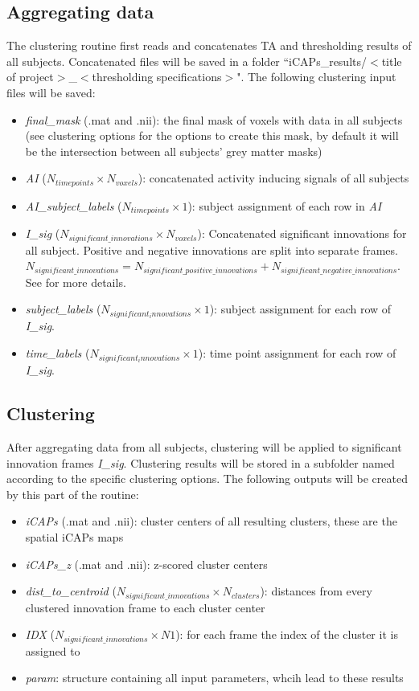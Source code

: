 \documentclass{article}
\begin{document}
\subsection{Aggregating data}
The clustering routine first reads and concatenates TA and thresholding results of all subjects. Concatenated files will be saved in a folder ``iCAPs\_results/$<$title of project$>$\_$<$thresholding specifications$>$". The following clustering input files will be saved:
\begin{itemize}
\item \textit{final\_mask} (.mat and .nii): the final mask of voxels with data in all subjects (see clustering options for the options to create this mask, by default it will be the intersection between all subjects' grey matter masks)
\item \textit{AI} ($N_{timepoints} \times N_{voxels}$): concatenated activity inducing signals of all subjects
\item \textit{AI\_subject\_labels} ($N_{timepoints} \times 1$): subject assignment of each row in \textit{AI}
\item \textit{I\_sig} ($N_{significant\_innovations} \times N_{voxels}$): Concatenated significant innovations for all subject. Positive and negative innovations are split into separate frames. $N_{significant\_innovations}=N_{significant\_positive\_innovations} + N_{significant\_negative\_innovations}$. See \cite{Karahanoglu2015} for more details.
\item \textit{subject\_labels} ($N_{significant_innovations} \times 1$): subject assignment for each row of \textit{I\_sig}.
\item \textit{time\_labels} ($N_{significant_innovations} \times 1$): time point assignment for each row of \textit{I\_sig}.
\end{itemize}

\subsection{Clustering}
After aggregating data from all subjects, clustering will be applied to significant innovation frames \textit{I\_sig}. Clustering results will be stored in a subfolder named according to the specific clustering options. The following outputs will be created by this part of the routine:
\begin{itemize}
\item \textit{iCAPs} (.mat and .nii): cluster centers of all resulting clusters, these are the spatial iCAPs maps
\item \textit{iCAPs\_z} (.mat and .nii): z-scored cluster centers
\item \textit{dist\_to\_centroid} ($N_{significant\_innovations} \times N_{clusters}$): distances from every clustered innovation frame to each cluster center
\item \textit{IDX}  ($N_{significant\_innovations} \times N1$): for each frame the index of the cluster it is assigned to
\item \textit{param}: structure containing all input parameters, whcih lead to these results
\end{itemize}
\end{document}
